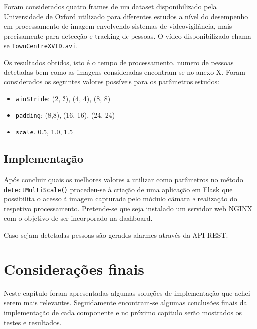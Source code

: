 Foram considerados quatro frames de um dataset disponibilizado pela Universidade de Oxford utilizado para diferentes estudos a nível do desempenho em processamento de imagem envolvendo sistemas de videovigilância, mais precisamente para detecção e tracking de pessoas\cite{imagProccdata}. O vídeo disponibilizado chama-se \texttt{TownCentreXVID.avi}. 

Os resultados obtidos, isto é o tempo de processamento, numero de pessoas detetadas bem como as imagens consideradas encontram-se no anexo X. Foram considerados os seguintes valores possíveis para os parâmetros estudos: 

\begin{itemize}
	\item \texttt{winStride}: (2, 2), (4, 4), (8, 8)
	
	\item \texttt{padding}: (8,8), (16, 16), (24, 24)
	
	\item \texttt{scale}: 0.5, 1.0, 1.5 
\end{itemize}


\subsection{Implementação}


Após concluir quais os melhores valores a utilizar como parâmetros no método \linebreak \texttt{detectMultiScale()}  procedeu-se à criação de uma aplicação em Flask que possibilita o acesso à imagem capturada pelo módulo câmara e realização do respetivo processamento. Pretende-se que seja instalado um servidor web NGINX com o objetivo de ser incorporado na dashboard. 


Caso sejam detetadas pessoas são gerados alarmes através da \ac{API} \ac{REST}. 
\fi







\section{Considerações finais}

Neste capítulo foram apresentadas algumas soluções de implementação que achei serem mais relevantes. Seguidamente encontram-se algumas conclusões finais da implementação de cada componente e no próximo capitulo serão mostrados os testes e resultados. 



